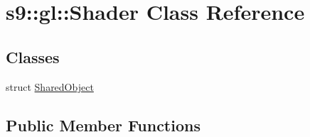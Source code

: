\hypertarget{classs9_1_1gl_1_1Shader}{\section{s9\-:\-:gl\-:\-:Shader Class Reference}
\label{classs9_1_1gl_1_1Shader}
}
\subsection*{Classes}
\begin{DoxyCompactItemize}
\item 
struct \hyperlink{structs9_1_1gl_1_1Shader_1_1SharedObject}{Shared\-Object}
\end{DoxyCompactItemize}
\subsection*{Public Member Functions}
